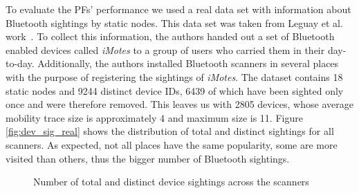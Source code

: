To evaluate the PFs' performance we used a real data set with
information about Bluetooth sightings by static nodes. This data set
was taken from Leguay et al. work~\cite{leguay2006opportunistic}. To
collect this information, the authors handed out a set of Bluetooth
enabled devices called \emph{iMotes} to a group of users who carried
them in their day-to-day. Additionally, the authors installed
Bluetooth scanners in several places with the purpose of registering the
sightings of \emph{iMotes}. The dataset contains 18 static nodes and
9244 distinct device IDs, 6439 of which have been sighted only once
and were therefore removed. This leaves us with 2805 devices, whose
average mobility trace size is approximately 4 and maximum size is
11. Figure \ref{fig:dev_sig_real} shows the distribution of total and
distinct sightings for all scanners. As expected, not all places have
the same popularity, some are more visited than others, thus the
bigger number of Bluetooth sightings.

\begin{figure}[htb]
 
\caption{Number of total and distinct device sightings across the scanners}
\label{fig:deviceSightings}
\end{figure}

